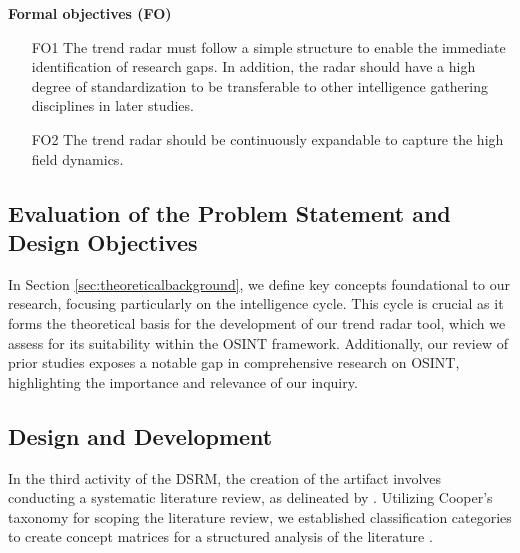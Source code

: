 \documentclass[10pt]{article}
\begin{document}
\textbf{Formal objectives (FO)}
\begin{itemize}
    \item[FO1] The trend radar must follow a simple structure to enable the immediate identification of research gaps. In addition, the radar should have a high degree of standardization to be transferable to other intelligence gathering disciplines in later studies.
    \item[FO2] The trend radar should be continuously expandable to capture the high field dynamics.
\end{itemize}


\subsection{Evaluation of the Problem Statement and Design Objectives}

In Section \ref{sec:theoreticalbackground}, we define key concepts foundational to our research, focusing particularly on the intelligence cycle. This cycle is crucial as it forms the theoretical basis for the development of our trend radar tool, which we assess for its suitability within the OSINT framework. Additionally, our review of prior studies exposes a notable gap in comprehensive research on OSINT, highlighting the importance and relevance of our inquiry.


\subsection{Design and Development}
In the third activity of the DSRM, the creation of the artifact involves conducting a systematic literature review, as delineated by \cite{Cleven.2009}. Utilizing Cooper's taxonomy \cite{Cooper.1988} for scoping the literature review, we established classification categories to create concept matrices for a structured analysis of the literature \cite{Webster.2002}.
\end{document}
